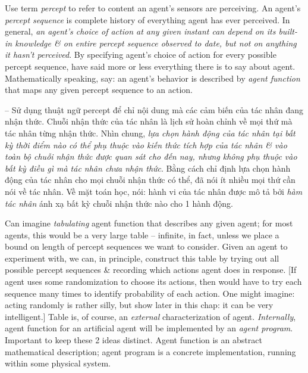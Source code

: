 \documentclass{article}
\begin{document}
\begin{itemize}
\begin{itemize}
\begin{itemize}
			Use term {\it percept} to refer to content an agent's sensors are perceiving. An agent's {\it percept sequence} is complete history of everything agent has ever perceived. In general, {\it an agent's choice of action at any given instant can depend on its built-in knowledge \& on entire percept sequence observed to date, but not on anything it hasn't perceived}. By specifying agent's choice of action for every possible percept sequence, have said more or less everything there is to say about agent. Mathematically speaking, say: an agent's behavior is described by {\it agent function} that maps any given percept sequence to an action.
			
			-- Sử dụng thuật ngữ percept để chỉ nội dung mà các cảm biến của tác nhân đang nhận thức. Chuỗi nhận thức của tác nhân là lịch sử hoàn chỉnh về mọi thứ mà tác nhân từng nhận thức. Nhìn chung, {\it lựa chọn hành động của tác nhân tại bất kỳ thời điểm nào có thể phụ thuộc vào kiến thức tích hợp của tác nhân \& vào toàn bộ chuỗi nhận thức được quan sát cho đến nay, nhưng không phụ thuộc vào bất kỳ điều gì mà tác nhân chưa nhận thức}. Bằng cách chỉ định lựa chọn hành động của tác nhân cho mọi chuỗi nhận thức có thể, đã nói ít nhiều mọi thứ cần nói về tác nhân. Về mặt toán học, nói: hành vi của tác nhân được mô tả bởi {\it hàm tác nhân} ánh xạ bất kỳ chuỗi nhận thức nào cho 1 hành động.
			
			Can imagine {\it tabulating} agent function that describes any given agent; for most agents, this would be a very large table -- infinite, in fact, unless we place a bound on length of percept sequences we want to consider. Given an agent to experiment with, we can, in principle, construct this table by trying out all possible percept sequences \& recording which actions agent does in response. [If agent uses some randomization to choose its actions, then would have to try each sequence many times to identify probability of each action. One might imagine: acting randomly is rather silly, but show later in this chap: it can be very intelligent.] Table is, of course, an {\it external} characterization of agent. {\it Internally}, agent function for an artificial agent will be implemented by an {\it agent program}. Important to keep these 2 ideas distinct. Agent function is an abstract mathematical description; agent program is a concrete implementation, running within some physical system.
			

\end{itemize}
\end{itemize}
\end{itemize}
\end{document}
